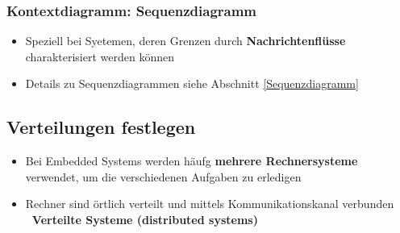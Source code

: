 \subsubsection{Kontextdiagramm: Sequenzdiagramm}

\begin{itemize}
    \item Speziell bei Syetemen, deren Grenzen durch \textbf{Nachrichtenflüsse} charakterisiert werden können
    \item Details zu Sequenzdiagrammen siehe Abschnitt \ref{Sequenzdiagramm}
\end{itemize}


\subsection{Verteilungen festlegen}

\begin{itemize}
    \item Bei Embedded Systems werden häufg \textbf{mehrere Rechnersysteme} verwendet, um die verschiedenen Aufgaben zu erledigen
    \item Rechner sind örtlich verteilt und mittels Kommunikationskanal verbunden \\
        \textbf{\textrightarrow\ Verteilte Systeme (distributed systems)}
\end{itemize}

\vspace{0.2cm}

